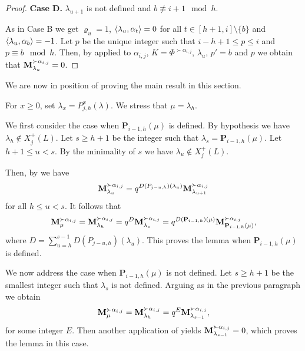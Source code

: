 \begin{proof}
\medskip
\textbf{Case D.} $\lambda_{u+1}$ is not defined and  $b \not \equiv i+1 \mod h$.
\medskip

As in Case B we get $\varrho_{u}=1$,    $\langle \lambda_u , \alpha_t \rangle=0$ for all $t\in  [h+1,i]\setminus\{b\}$ and $\langle \lambda_{u} , \alpha_{b} \rangle = -1$.   
Let $p$ be the unique integer such that  $i-h+1\leq p\leq i$ and $p\equiv b \mod h$. 
Then,  by  applied to $\alpha_{i,j}$, $K=\Phi^{\succ \alpha_{i,j}}$,  $\lambda_{u}$, $p' = b$ and $p$ we obtain that $\mathbf{M}_{\lambda_{u}}^{\succ\alpha_{i,j}}=0$.
\end{proof}


We are now in position of proving the main result in this section. 



\begin{myproof}
For $x \geq 0$, set $\lambda_x = P^x_{j,h}(\lambda)$.
We stress that $\mu=\lambda_h $.

We first consider the case when $\mathbf{P}_{i-1,h}(\mu)$ is defined.
By hypothesis we have $\lambda_{h} \notin X_{j}^+(L)$.
Let $s\geq h+1$ be the integer such that $\lambda_s = \mathbf{P}_{i-1,h}(\mu) $.
Let $h+1\leq u <s$. 
By the minimality of $s$ we have $\lambda_{u} \notin X_{j}^+(L)$. 


Then, by   we have
\begin{equation}
    \mathbf{M}_{\lambda_{u}}^{\succ \alpha_{i,j}}
    = q^{D(P_{j-u,h})(\lambda_{u})}
      \mathbf{M}_{\lambda_{u+1}}^{\succ \alpha_{i,j}}
\end{equation}
for all $h \leq u <s$. It follows that
\begin{equation}
 \displaystyle   \mathbf{M}_{\mu}^{\succ \alpha_{i,j}} =   \mathbf{M}_{\lambda_h}^{\succ \alpha_{i,j}}
    = q^{D}
      \mathbf{M}_{\lambda_s}^{\succ \alpha_{i,j}}
    = q^{D(\mathbf{P}_{i - 1,h})(\mu)}
      \mathbf{M}_{\mathbf{P}_{i - 1,h}(\mu)}^{\succ \alpha_{i,j}},
\end{equation}
where $\displaystyle D=\sum_{u =h}^{s-1} D(P_{j-u,h})(\lambda_{u})$.
This proves the lemma when $\mathbf{P}_{i - 1,h}(\mu)$ is defined.


We now address the case when $\mathbf{P}_{i-1,h}(\mu)$ is not defined.
Let $s\geq h+1$ be the smallest  integer such that $\lambda_s$ is not defined.
Arguing as in the previous paragraph we obtain
\begin{equation}
    \mathbf{M}_{\mu}^{\succ \alpha_{i,j}} =   \mathbf{M}_{\lambda_h}^{\succ \alpha_{i,j}} = q^E \mathbf{M}_{\lambda_{s-1}}^{\succ \alpha_{i,j}}, 
\end{equation}
for some integer $E$. 
Then another application of  yields $\mathbf{M}_{\lambda_{s-1}}^{\succ \alpha_{i,j}}=0$, which proves the lemma in this case. 
\end{myproof}



